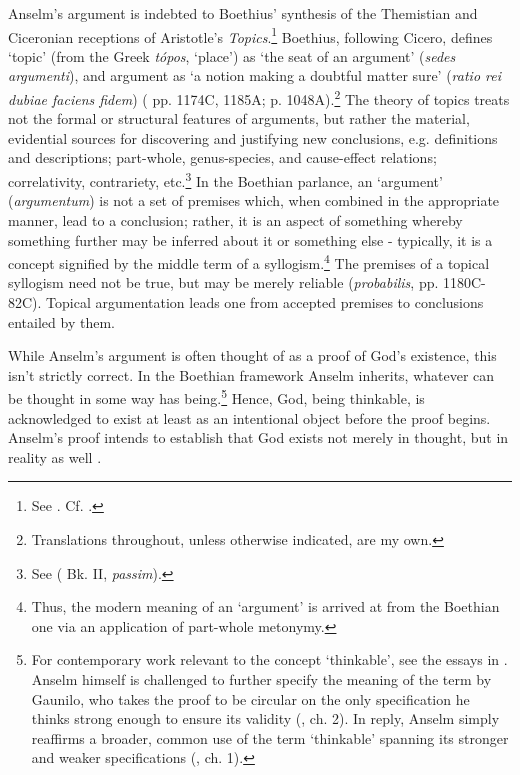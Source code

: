 \documentclass[]{birkjour}
\begin{document}
Anselm's argument is indebted to Boethius' synthesis of the Themistian and Ciceronian receptions of Aristotle's \textit{Topics}.\footnote{See \cite{Archambault2017,Holopainen2007}. Cf. \cite{Cerezo2015,Henry1974}.} Boethius, following Cicero, defines `topic' (from the Greek \textit{t\'{o}pos},  `place') as `the seat of an argument' (\textit{sedes argumenti}), and argument as `a notion making a doubtful matter sure' (\textit{ratio rei dubiae faciens fidem}) (\cite{BDT} pp. 1174C, 1185A; \cite{BTC} p. 1048A).\footnote{Translations throughout, unless otherwise indicated, are my own.} The theory of topics treats not the formal or structural features of arguments, but rather the material, evidential sources for discovering and justifying new conclusions, e.g. definitions and descriptions; part-whole, genus-species, and cause-effect relations; correlativity, contrariety, etc.\footnote{See (\cite{BDT} Bk. II, \textit{passim}).} In the Boethian parlance, an `argument' (\textit{argumentum}) is not a set of premises which, when combined in the appropriate manner, lead to a conclusion; rather, it is an aspect of something whereby something further may be inferred about it or something else - typically, it is a concept signified by the middle term of a syllogism.\footnote{Thus, the modern meaning of an `argument' is arrived at from the Boethian one via an application of part-whole metonymy.} The premises of a topical syllogism need not be true, but may be merely reliable (\textit{probabilis}, \cite{BDT} pp. 1180C-82C). Topical argumentation leads one from accepted premises to conclusions entailed by them. 

While Anselm's argument is often thought of as a proof of God's existence, this isn't strictly correct. In the Boethian framework Anselm inherits, whatever can be thought in some way has being.\footnote{For contemporary work relevant to the concept `thinkable', see the essays in \cite{Gendler2002}. Anselm himself is challenged to further specify the meaning of the term by Gaunilo, who takes the proof to be circular on the only specification he thinks strong enough to ensure its validity (\cite{ProIns}, ch. 2). In reply, Anselm simply reaffirms a broader, common use of the term `thinkable' spanning its stronger and weaker specifications (\cite{AnselmResp}, ch. 1).} Hence, God, being thinkable, is acknowledged to exist at least as an intentional object before the proof begins. Anselm's proof intends to establish that God exists not merely in thought, but in reality as well \cite{Klima2000}.
\end{document}
